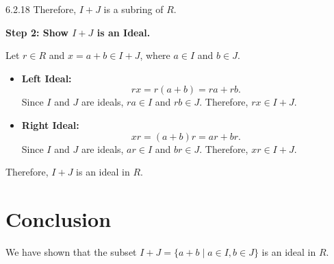 \documentclass[12pt]{amsart}
\theoremstyle{definition}
\numberwithin{equation}{section}
\begin{document}
\begin{exercise}{6.2.18}
    Therefore, \(I + J\) is a subring of \(R\).

    \noindent \textbf{Step 2: Show \(I + J\) is an Ideal.}

    Let \(r \in R\) and \(x = a + b \in I + J\), where \(a \in I\) and \(b \in J\).

    \begin{itemize}
        \item \textbf{Left Ideal:}
        \[
        rx = r(a + b) = ra + rb.
        \]
        Since \(I\) and \(J\) are ideals, \(ra \in I\) and \(rb \in J\). Therefore, \(rx \in I + J\).

        \item \textbf{Right Ideal:}
        \[
        xr = (a + b)r = ar + br.
        \]
        Since \(I\) and \(J\) are ideals, \(ar \in I\) and \(br \in J\). Therefore, \(xr \in I + J\).
    \end{itemize}

    Therefore, \(I + J\) is an ideal in \(R\).

    \section*{Conclusion}
    We have shown that the subset \(I + J = \{a + b \mid a \in I, b \in J\} \) is an ideal in \(R\).

\end{exercise}
\newpage
\end{document}
